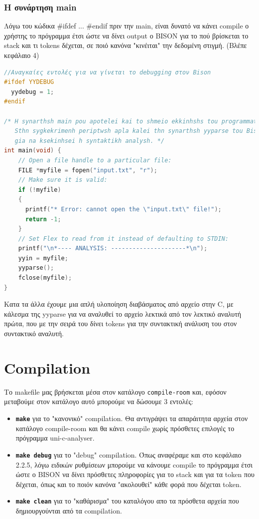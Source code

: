 \documentclass[14pt]{extarticle}
\begin{document}
\subsubsection{Η συνάρτηση main}
Λόγω του κώδικα #ifdef ... #endif πριν την main, είναι δυνατό να κάνει compile
ο χρήστης το πρόγραμμα έτσι ώστε να δίνει output ο BISON για το πού βρίσκεται το
stack και τι tokens δέχεται, σε ποιό κανόνα "κινέιται" την δεδομένη στιγμή. (Βλέπε κεφάλαιο 4)
\begin{lstlisting}[language=C]
//Αναγκαίες εντολές για να γίνεται το debugging στον Bison
#ifdef YYDEBUG
  yydebug = 1;
#endif

/* H synarthsh main pou apotelei kai to shmeio ekkinhshs tou programmatos.
   Sthn sygkekrimenh periptwsh apla kalei thn synarthsh yyparse tou Bison
   gia na ksekinhsei h syntaktikh analysh. */
int main(void) {
    // Open a file handle to a particular file:
    FILE *myfile = fopen("input.txt", "r");
    // Make sure it is valid:
    if (!myfile)
    {
      printf("* Error: cannot open the \"input.txt\" file!");
      return -1;
    }
    // Set Flex to read from it instead of defaulting to STDIN:
    printf("\n*---- ANALYSIS: ---------------------*\n");
    yyin = myfile;
    yyparse();
    fclose(myfile);
}
\end{lstlisting}
Κατα τα άλλα έχουμε μια απλή υλοποίηση διαβάσματος από αρχείο στην C, με κάλεσμα
της yyparse για να αναλυθεί το αρχείο λεκτικά από τον λεκτικό αναλυτή πρώτα, που με την σειρά
του δίνει tokens για την συντακτική ανάλυση του στον συντακτικό αναλυτή.
\section{Compilation}
Το makefile μας βρήσκεται μέσα στον κατάλογο \texttt{compile-room} και, εφόσον μεταβούμε
στον κατάλογο αυτό μπορούμε να δώσουμε 3 εντολές:

\begin{itemize}
    \item \texttt{\textbf{make}} για το "κανονικό" compilation. Θα αντιγράψει τα απαράιτητα
        αρχεία στον κατάλογο compile-room και θα κάνει compile χωρίς πρόσθετες επιλογές
        το πρόγραμμα uni-c-analyser.
    \item \texttt{\textbf{make debug}} για το "debug" compilation. Όπως αναφέραμε
        και στο κεφάλαιο 2.2.5, λόγω ειδικών ρυθμίσεων μπορούμε να κάνουμε compile
        το πρόγραμμα έτσι ώστε ο BISON να δίνει πρόσθετες πληροφορίες για το stack και
        για τα token που δέχεται, όπως και το ποιόν κανόνα "ακολουθεί" κάθε φορά που
        δέχεται token.
    \item \texttt{\textbf{make clean}} για το "καθάρισμα" του καταλόγου απο τα πρόσθετα αρχεία
        που δημιουργούνται από τα compilation.
\end{itemize}
\end{document}
